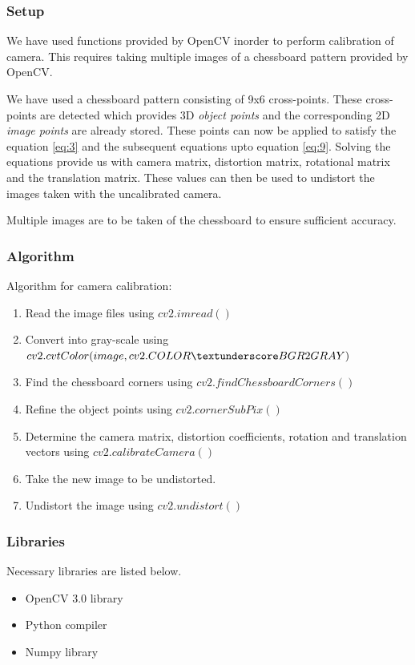 \documentclass[12pt, a4paper, font = Times New Roman]{article}
\begin{document}
\subsubsection{Setup}
\par
We have used functions provided by OpenCV inorder to perform calibration of camera. This requires taking multiple images of a chessboard pattern provided by OpenCV.
\par
We have used a chessboard pattern consisting of 9x6 cross-points. These cross-points are detected which provides 3D \emph{object points} and the corresponding 2D \emph{image points} are already stored. These points can now be applied to satisfy the equation \ref{eq:3} and the subsequent equations upto equation \ref{eq:9}. Solving the equations provide us with camera matrix, distortion matrix, rotational matrix and the translation matrix. These values can then be used to undistort the images taken with the uncalibrated camera.
\par
 Multiple images are to be taken of the chessboard to ensure sufficient accuracy.
\subsubsection{Algorithm}

Algorithm for camera calibration:
\begin{enumerate}
	\item Read the image files using $cv2.imread()$
	\item Convert into gray-scale using $cv2.cvtColor(image,cv2.COLOR\textunderscore BGR2GRAY)$
	\item Find the chessboard corners using $cv2.findChessboardCorners()$
	\item Refine the object points using $cv2.cornerSubPix()$
	\item Determine the camera matrix, distortion coefficients, rotation and translation vectors using $cv2.calibrateCamera()$
	\item Take the new image to be undistorted.
	\item Undistort the image using $cv2.undistort()$
\end{enumerate}

\subsubsection{Libraries}
Necessary libraries are listed below.
\begin{itemize}
\item OpenCV 3.0 library
\item Python compiler
\item Numpy library
\end{itemize}
\end{document}
